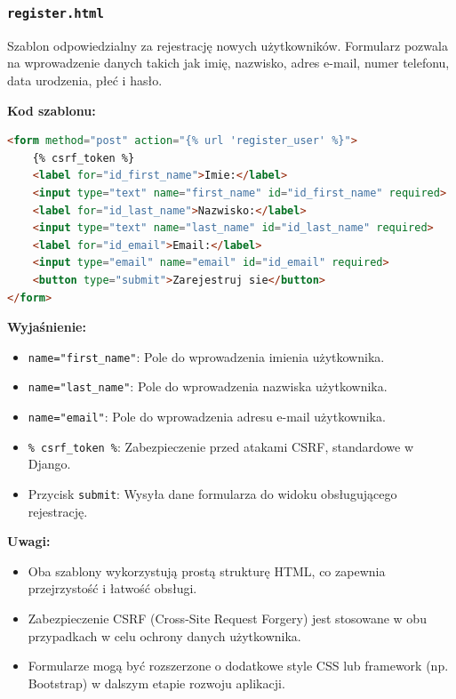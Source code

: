 \documentclass[12pt,a4paper,oneside]{article}
\theoremstyle{definition}
\numberwithin{equation}{section}
\begin{document}
\subsubsection*{\texttt{register.html}}
\label{sec:register_template}

Szablon odpowiedzialny za rejestrację nowych użytkowników. Formularz pozwala na wprowadzenie danych takich jak imię, nazwisko, adres e-mail, numer telefonu, data urodzenia, płeć i hasło.

\textbf{Kod szablonu:}
\begin{lstlisting}[language=HTML, caption=Szablon \texttt{register.html}]
<form method="post" action="{% url 'register_user' %}">
    {% csrf_token %}
    <label for="id_first_name">Imie:</label>
    <input type="text" name="first_name" id="id_first_name" required>
    <label for="id_last_name">Nazwisko:</label>
    <input type="text" name="last_name" id="id_last_name" required>
    <label for="id_email">Email:</label>
    <input type="email" name="email" id="id_email" required>
    <button type="submit">Zarejestruj sie</button>
</form>
\end{lstlisting}

\textbf{Wyjaśnienie:}
\begin{itemize}
    \item \texttt{name="first\_name"}: Pole do wprowadzenia imienia użytkownika.
    \item \texttt{name="last\_name"}: Pole do wprowadzenia nazwiska użytkownika.
    \item \texttt{name="email"}: Pole do wprowadzenia adresu e-mail użytkownika.
    \item \texttt{{\% csrf\_token \%}}: Zabezpieczenie przed atakami CSRF, standardowe w Django.
    \item Przycisk \texttt{submit}: Wysyła dane formularza do widoku obsługującego rejestrację.
\end{itemize}

\textbf{Uwagi:}
\begin{itemize}
    \item Oba szablony wykorzystują prostą strukturę HTML, co zapewnia przejrzystość i łatwość obsługi.
    \item Zabezpieczenie CSRF (Cross-Site Request Forgery) jest stosowane w obu przypadkach w celu ochrony danych użytkownika.
    \item Formularze mogą być rozszerzone o dodatkowe style CSS lub framework (np. Bootstrap) w dalszym etapie rozwoju aplikacji.
\end{itemize}
\end{document}
